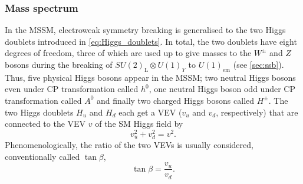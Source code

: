 \subsubsection{Mass spectrum}

In the MSSM, electroweak symmetry breaking is generalised to the two Higgs doublets introduced in \cref{eq:Higgs_doublets}. In total, the two doublets have eight degrees of freedom, three of which are used up to give masses to the $W^\pm$ and $Z$ bosons during the breaking of $SU(2)_\mathrm{L}\otimes U(1)_Y$ to $U(1)_\mathrm{em}$ (see \cref{sec:ssb}). Thus, five physical Higgs bosons appear in the MSSM; two neutral Higgs bosons even under CP transformation called $h^0$, one neutral Higgs boson odd under CP transformation called $A^0$ and finally two charged Higgs bosons called $H^\pm$. The two Higgs doublets $H_u$ and $H_d$ each get a VEV ($v_u$ and $v_d$, respectively) that are connected to the VEV $v$ of the SM Higgs field by
\begin{equation}
	v_u^2 + v_d^2 = v^2.
\end{equation}
Phenomenologically, the ratio of the two VEVs is usually considered, conventionally called $\tan{\beta}$,
\begin{equation}
	\tan{\beta} = \frac{v_u}{v_d}.
\end{equation}


